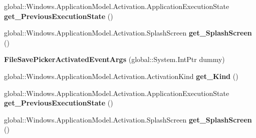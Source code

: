 \begin{DoxyCompactItemize}
global\+::\+Windows.\+Application\+Model.\+Activation.\+Application\+Execution\+State {\bfseries get\+\_\+\+Previous\+Execution\+State} ()
\item 
\mbox{\label{class_windows_1_1_application_model_1_1_activation_1_1_file_save_picker_activated_event_args_a267e1f73d5ddd40ddfecc19ef78e13a0}} 
global\+::\+Windows.\+Application\+Model.\+Activation.\+Splash\+Screen {\bfseries get\+\_\+\+Splash\+Screen} ()
\item 
\mbox{\label{class_windows_1_1_application_model_1_1_activation_1_1_file_save_picker_activated_event_args_ae899934ca1652ab5d6dfd11011243dcf}} 
{\bfseries File\+Save\+Picker\+Activated\+Event\+Args} (global\+::\+System.\+Int\+Ptr dummy)
\item 
\mbox{\label{class_windows_1_1_application_model_1_1_activation_1_1_file_save_picker_activated_event_args_ae658916307d3ac97784cf5ebc417a45f}} 
global\+::\+Windows.\+Application\+Model.\+Activation.\+Activation\+Kind {\bfseries get\+\_\+\+Kind} ()
\item 
\mbox{\label{class_windows_1_1_application_model_1_1_activation_1_1_file_save_picker_activated_event_args_a8e3dd20c577382295b49b313910b5bab}} 
global\+::\+Windows.\+Application\+Model.\+Activation.\+Application\+Execution\+State {\bfseries get\+\_\+\+Previous\+Execution\+State} ()
\item 
\mbox{\label{class_windows_1_1_application_model_1_1_activation_1_1_file_save_picker_activated_event_args_a267e1f73d5ddd40ddfecc19ef78e13a0}} 
global\+::\+Windows.\+Application\+Model.\+Activation.\+Splash\+Screen {\bfseries get\+\_\+\+Splash\+Screen} ()
\item 
\mbox{\label{class_windows_1_1_application_model_1_1_activation_1_1_file_save_picker_activated_event_args_ae899934ca1652ab5d6dfd11011243dcf}} 

\end{DoxyCompactItemize}
